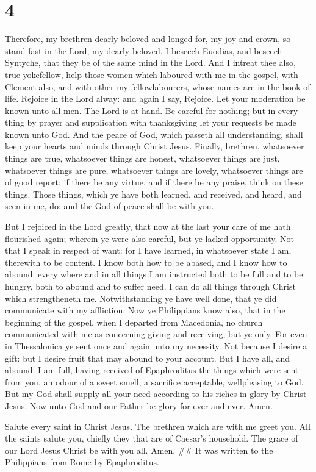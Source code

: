\hypertarget{section-3}{%
\section{4}\label{section-3}}

 Therefore, my brethren dearly beloved and longed for, my
joy and crown, so stand fast in the Lord, my dearly beloved.
 I beseech Euodias, and beseech Syntyche, that they be of
the same mind in the Lord.  And I intreat thee also, true
yokefellow, help those women which laboured with me in the gospel, with
Clement also, and with other my fellowlabourers, whose names are in the
book of life.  Rejoice in the Lord alway: and again I say,
Rejoice.  Let your moderation be known unto all men. The
Lord is at hand.  Be careful for nothing; but in every
thing by prayer and supplication with thanksgiving let your requests be
made known unto God.  And the peace of God, which passeth
all understanding, shall keep your hearts and minds through Christ
Jesus.  Finally, brethren, whatsoever things are true,
whatsoever things are honest, whatsoever things are just, whatsoever
things are pure, whatsoever things are lovely, whatsoever things are of
good report; if there be any virtue, and if there be any praise, think
on these things.  Those things, which ye have both
learned, and received, and heard, and seen in me, do: and the God of
peace shall be with you.

 But I rejoiced in the Lord greatly, that now at the last
your care of me hath flourished again; wherein ye were also careful, but
ye lacked opportunity.  Not that I speak in respect of
want: for I have learned, in whatsoever state I am, therewith to be
content.  I know both how to be abased, and I know how to
abound: every where and in all things I am instructed both to be full
and to be hungry, both to abound and to suffer need.  I
can do all things through Christ which strengtheneth me. 
Notwithstanding ye have well done, that ye did communicate with my
affliction.  Now ye Philippians know also, that in the
beginning of the gospel, when I departed from Macedonia, no church
communicated with me as concerning giving and receiving, but ye only.
 For even in Thessalonica ye sent once and again unto my
necessity.  Not because I desire a gift: but I desire
fruit that may abound to your account.  But I have all,
and abound: I am full, having received of Epaphroditus the things which
were sent from you, an odour of a sweet smell, a sacrifice acceptable,
wellpleasing to God.  But my God shall supply all your
need according to his riches in glory by Christ Jesus. 
Now unto God and our Father be glory for ever and ever. Amen.

 Salute every saint in Christ Jesus. The brethren which
are with me greet you.  All the saints salute you,
chiefly they that are of Caesar's household.  The grace
of our Lord Jesus Christ be with you all. Amen. \#\# It was written to
the Philippians from Rome by Epaphroditus.
